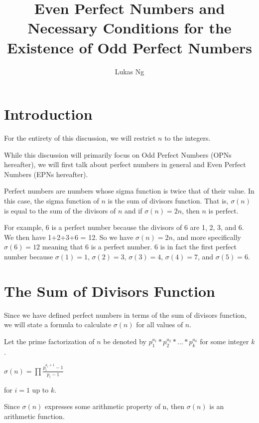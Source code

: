 \documentclass[12pt]{amsart}
\title{Even Perfect Numbers and Necessary Conditions for the Existence of Odd Perfect Numbers}
\author{Lukas Ng}
\begin{document}
\pagestyle{plain}

\maketitle

\newpage

\tableofcontents

\newpage

\section{Introduction}

For the entirety of this discussion, we will restrict $n$ to the integers.

While this discussion will primarily focus on Odd Perfect Numbers (OPNs hereafter), we will first talk about perfect numbers in general and Even Perfect Numbers (EPNs hereafter).

Perfect numbers are numbers whose sigma function is twice that of their value. In this case, the sigma function of $n$ is the sum of divisors function. That is, $\sigma (n)$ is equal to the sum of the divisors of $n$ and if $\sigma (n) = 2n$, then $n$ is perfect.

For example, 6 is a perfect number because the divisors of 6 are 1, 2, 3, and 6. We then have 1+2+3+6 = 12. So we have $\sigma (n) = 2n$, and more specifically $\sigma (6) = 12$ meaning that 6 is a perfect number. 6 is in fact the first perfect number because $\sigma (1) = 1$, $\sigma (2) = 3$, $\sigma (3) = 4$, $\sigma (4) = 7$, and $\sigma (5) = 6$. 

\newpage

\section{The Sum of Divisors Function}

Since we have defined perfect numbers in terms of the sum of divisors function, we will state a formula to calculate $\sigma(n)$ for all values of $n$.

Let the prime factorization of $n$ be denoted by $p_1^{a_1} * p_2^{a_2} * ... * p_k^{a_k}$ for some integer $k$.

\begin{center}
$\sigma(n) = \prod{\frac{p_i^{a_i + 1} - 1}{p_i - 1}}$

for $i = 1$ up to $k$.
\end{center}

Since $\sigma(n)$ expresses some arithmetic property of n, then $\sigma(n)$ is an arithmetic function.
\end{document}
